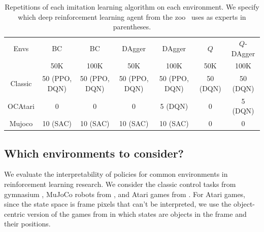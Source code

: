   
\begin{table}
  \centering
  \footnotesize
  \begin{tabular}{c|cccccc}
  \toprule
  Envs & BC & BC & DAgger & DAgger & $Q$ & $Q$-DAgger\\
   & 50K & 100K & 50K & 100K & 50K & 100K\\
  \midrule
  Classic& 50 (PPO, DQN)& 50 (PPO, DQN)& 50 (PPO, DQN)& 50 (PPO, DQN)&  50 (DQN) & 50 (DQN)\\
  OCAtari& 0 & 0 & 0 & 5 (DQN)&  0 & 5 (DQN)\\
  Mujoco& 10 (SAC)& 10 (SAC)& 10 (SAC)& 10 (SAC)&  0 & 0\\
  \bottomrule
  \end{tabular}
  \caption{Repetitions of each imitation learning algorithm on each environment. We specify which deep reinforcement learning agent from the zoo~\citep{zoo} uses as experts in parentheses.}
  \label{tab:repet-distill}
\end{table}

\subsection{Which environments to consider?}
We evaluate the interpretability of policies for common environments in reinforcement learning research.
We consider the classic control tasks from gymnasium \cite{gymnasium}, MuJoCo robots from \cite{mujoco}, and Atari games from \cite{atari}.
For Atari games, since the state space is frame pixels that can't be interpreted, we use the object-centric version of the games from \cite{ocatari} in which states are objects in the frame and their positions.

